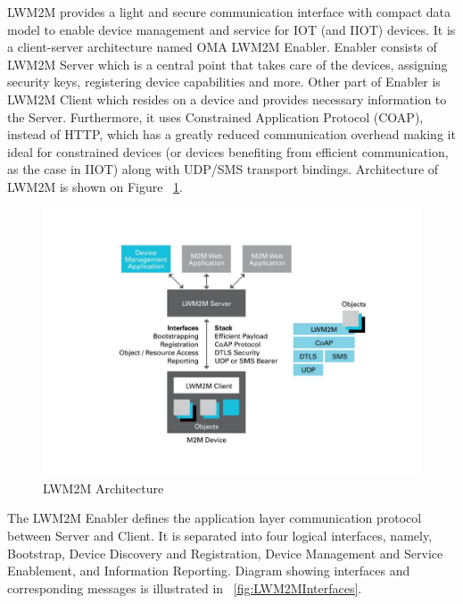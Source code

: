 LWM2M provides a light and secure communication interface with compact data model to enable device management and service for IOT (and IIOT) devices. It is a client-server architecture named OMA LWM2M Enabler. Enabler consists of LWM2M Server which is a central point that takes care of the devices, assigning security keys, registering device capabilities and more. Other part of Enabler is LWM2M Client which resides on a device and provides necessary information to the Server. Furthermore, it uses Constrained Application Protocol (COAP), instead of HTTP, which has a greatly reduced communication overhead making it ideal for constrained devices (or devices benefiting from efficient communication, as the case in IIOT) along with UDP/SMS transport bindings. Architecture of LWM2M is shown on Figure ~\ref{fig:LWM2MArchitecture}.

\begin{figure}[ht]
	\begin{center}
		\includegraphics[width=\textwidth]{images/LWM2M-Architecture}
		\caption{LWM2M Architecture}
		\label{fig:LWM2MArchitecture}
	\end{center}
\end{figure}

The LWM2M Enabler defines the application layer communication protocol between Server and Client. It is separated into four logical interfaces, namely, Bootstrap, Device Discovery and Registration, Device Management and Service Enablement, and Information Reporting. Diagram showing interfaces and corresponding messages is illustrated in ~\ref{fig:LWM2MInterfaces}.

